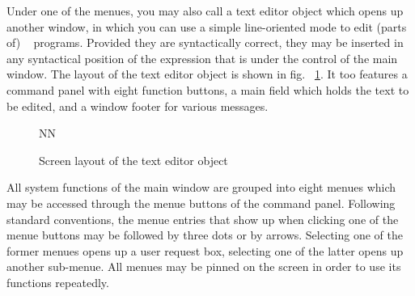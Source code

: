 Under one of the menues, you may also call a text editor object which opens up
another window, in which you can use a simple line-oriented mode 
to edit (parts of) \kir~ programs. Provided they are syntactically correct,
they may be inserted in any syntactical position
of the expression that is under the control of the main window. The layout of
the text editor object is shown in fig. ~\ref{textobject}. It too features 
a command panel with eight function buttons, a main field which holds the text to be
edited, and a window footer for various messages.  

\begin{figure}[htb]
\let\picnaturalsize=N
\def\picsize{12cm}
\def\picfilename{pics/texted.eps}
\centerline{\ifx\picnaturalsize N\epsfxsize \picsize\fi \epsfbox{\picfilename}}
\caption{\label{textobject} Screen layout of the text editor object}
\end{figure}

All system functions of the main window are grouped into eight menues which may be accessed
through the menue buttons of the command panel.  Following
standard conventions, the menue entries that show up when clicking one of the
menue buttons may be followed by three dots or by arrows. 
Selecting one of the former menues opens up a user request box, selecting one of the latter
opens up another sub-menue. All menues may be pinned on the screen in order to
 use its functions repeatedly.

